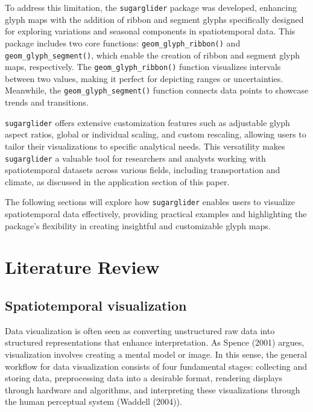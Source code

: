 To address this limitation, the \texttt{sugarglider} package was developed, enhancing glyph maps with the addition of ribbon and segment glyphs specifically designed for exploring variations and seasonal components in spatiotemporal data. This package includes two core functions: \texttt{geom\_glyph\_ribbon()} and \texttt{geom\_glyph\_segment()}, which enable the creation of ribbon and segment glyph maps, respectively. The \texttt{geom\_glyph\_ribbon()} function visualizes intervals between two values, making it perfect for depicting ranges or uncertainties. Meanwhile, the \texttt{geom\_glyph\_segment()} function connects data points to showcase trends and transitions.

\texttt{sugarglider} offers extensive customization features such as adjustable glyph aspect ratios, global or individual scaling, and custom rescaling, allowing users to tailor their visualizations to specific analytical needs. This versatility makes \texttt{sugarglider} a valuable tool for researchers and analysts working with spatiotemporal datasets across various fields, including transportation and climate, as discussed in the application section of this paper.

The following sections will explore how \texttt{sugarglider} enables users to visualize spatiotemporal data effectively, providing practical examples and highlighting the package's flexibility in creating insightful and customizable glyph maps.

\hypertarget{literature-review}{%
\section{Literature Review}\label{literature-review}}

\hypertarget{spatiotemporal-visualization}{%
\subsection{Spatiotemporal visualization}\label{spatiotemporal-visualization}}

Data visualization is often seen as converting unstructured raw data into structured representations that enhance interpretation. As Spence (2001) argues, visualization involves creating a mental model or image. In this sense, the general workflow for data visualization consists of four fundamental stages: collecting and storing data, preprocessing data into a desirable format, rendering displays through hardware and algorithms, and interpreting these visualizations through the human perceptual system (Waddell (2004)).

